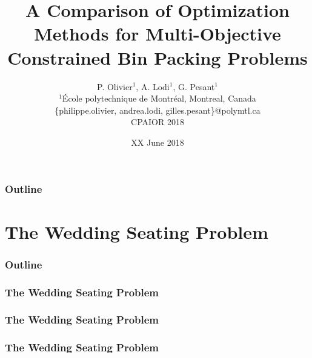 \documentclass{beamer}
\title[Comparison of Optimization Methods]{A Comparison of Optimization Methods for Multi-Objective Constrained Bin Packing Problems}
\author[P. Olivier, A. Lodi, G. Pesant] {
  P. Olivier$^1$, A. Lodi$^1$, G. Pesant$^1$ \\
  \vspace{0.5cm}
  \scriptsize $^1$École polytechnique de Montréal, Montreal, Canada \\
  \{philippe.olivier, andrea.lodi, gilles.pesant\}@polymtl.ca \\
  \vspace{1cm}
  \normalsize CPAIOR 2018
}
\date[CPAIOR 2018]{XX June 2018}
\newcommand{\AutoSectionTitle}{}
\begin{document}
\begin{frame}
  \titlepage
\end{frame}

\begin{frame}
  \frametitle{Outline}
  \tableofcontents
\end{frame}




\renewcommand{\AutoSectionTitle}{The Wedding Seating Problem}

\section{\AutoSectionTitle}

\begin{frame}
  \frametitle{Outline}
  \tableofcontents[currentsection]
\end{frame}




\begin{frame}
  \frametitle{\AutoSectionTitle}
  
  \begin{center}
    
  \end{center}
  
\end{frame}




\begin{frame}
  \frametitle{\AutoSectionTitle}
  
  \begin{center}
    
  \end{center}
  
\end{frame}




\begin{frame}
  \frametitle{\AutoSectionTitle}
  
  \begin{center}
    
  \end{center}
  
\end{frame}
\end{document}
